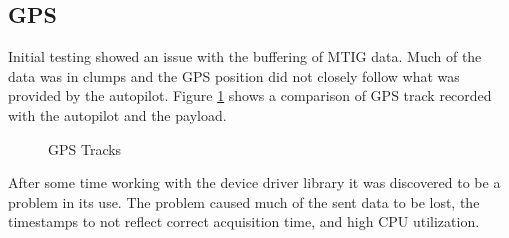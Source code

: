 \documentclass[a4paper,11pt]{report}
\begin{document}
\subsection{GPS}

Initial testing showed an issue with the buffering of MTIG data. Much of the data was in clumps and the GPS position did not closely follow what was provided by the autopilot. Figure \ref{fig:track_comp} shows a comparison of GPS track recorded with the autopilot and the payload.

\begin{figure}[ht]
  \centering
  \caption{GPS Tracks}
  \label{fig:track_comp}
\end{figure} 

After some time working with the device driver library it was discovered to be a problem in its use. The problem caused much of the sent data to be lost, the timestamps to not reflect correct acquisition time, and high CPU utilization. 
\end{document}
